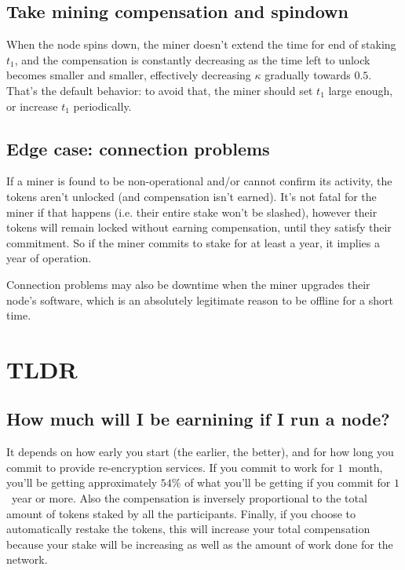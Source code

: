 \documentclass[longbibliography,nofootinbib,twocolumn]{revtex4-1}
\begin{document}
\subsection{Take mining compensation and spindown}

When the node spins down, the miner doesn't extend the time for end of staking $t_1$,
and the compensation is constantly decreasing as the time left to unlock becomes smaller and smaller,
effectively decreasing $\kappa$ gradually towards $0.5$.
That's the default behavior: to avoid that, the miner should set $t_1$ large enough, or increase $t_1$ periodically.

\subsection{Edge case: connection problems}

If a miner is found to be non-operational and/or cannot confirm its activity, the tokens aren't unlocked (and compensation isn't earned).
It's not fatal for the miner if that happens (i.e. their entire stake won't be slashed), however their tokens will remain locked without earning compensation,
until they satisfy their commitment.
So if the miner commits to stake for at least a year, it implies a year of operation.

Connection problems may also be downtime when the miner upgrades their node's software, which is an absolutely legitimate reason to be offline for a short time.

\section{TLDR}

\subsection{How much will I be earnining if I run a node?}
It depends on how early you start (the earlier, the better), and for how long you commit to provide re-encryption services.
If you commit to work for $1$~month, you'll be getting approximately $54\%$ of what you'll be getting if you commit for $1$~year or more.
Also the compensation is inversely proportional to the total amount of tokens staked by all the participants.
Finally, if you choose to automatically restake the tokens, this will increase your total compensation because your stake will be increasing as
well as the amount of work done for the network.
\end{document}
